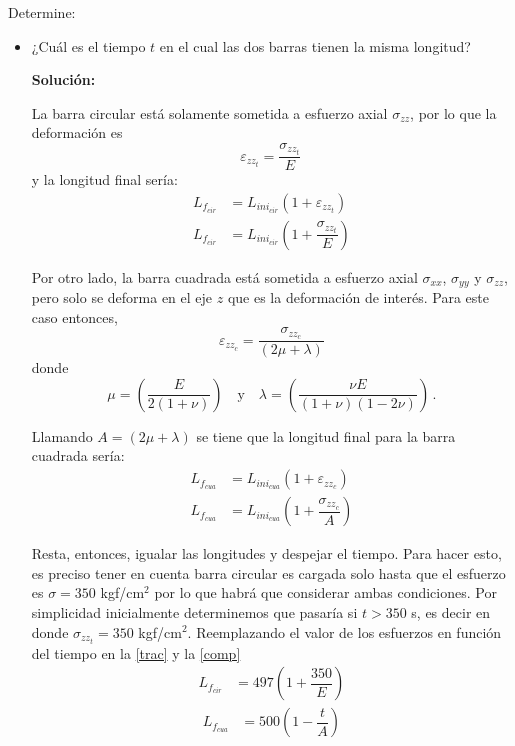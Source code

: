 \documentclass[../notas medios.tex]{subfiles}
\begin{document}
Determine:
\begin{itemize}
\item ¿Cuál es el tiempo $t$ en el cual las dos barras tienen la misma longitud?

\textbf{Solución:}

La barra circular está solamente sometida a esfuerzo axial $\sigma_{zz}$, por lo que la deformación es
\[\varepsilon _{zz_t} = \dfrac{\sigma_{zz_t} }{E}\, \]
y la longitud final sería:
\begin{equation}
  \begin{split}
  L_{f_{cir}} & = L_{ini_{cir}} (1 +  \varepsilon_{zz_t} )\\
  L_{f_{cir}} & = L_{ini_{cir}} \left(1+  \dfrac{\sigma_{zz_t} }{E}\right)
  \end{split}
  \label{trac}
\end{equation}

Por otro lado, la barra cuadrada está sometida a esfuerzo axial $\sigma_{xx}$, $\sigma_{yy}$ y $\sigma_{zz}$, pero solo se deforma en el eje $z$ que es la deformación de interés. Para este caso entonces,
\[\varepsilon _{zz_c} = \dfrac{\sigma_{zz_c} }{(2 \mu + \lambda)}\]
donde
\[\mu = \left(\dfrac{E}{2(1 + \nu)}\right)\quad  \text{y}\quad
\lambda =  \left(\dfrac{\nu{E}}{(1 + \nu) (1 - 2\nu)}\right)\, .\]

Llamando $A = (2 \mu + \lambda)$ se tiene que la longitud final para la barra cuadrada sería:
\begin{equation}
  \begin{split}
  L_{f_{cua}} & = L_{ini_{cua}} (1 +  \varepsilon_{zz_c}) \\
  L_{f_{cua}} & = L_{ini_{cua}} \left(1 +  \dfrac{\sigma_{zz_c} }{A}\right)
  \end{split}
\label{comp}
\end{equation}

Resta, entonces, igualar las longitudes y despejar el tiempo. Para hacer esto, es preciso tener en cuenta barra circular es cargada solo hasta que el esfuerzo es $\sigma=350$ kgf/cm$^2$ por lo que habrá que considerar ambas condiciones. Por simplicidad inicialmente determinemos que pasaría si $t > 350$ s, es decir en donde $\sigma_{zz_t} = 350$  kgf/cm$^2$. Reemplazando el valor de los esfuerzos en función del tiempo en la \cref {trac} y la  \cref{comp}
\begin{equation}
  \begin{split}
  L_{f_{cir}} & = 497 \left(1 +  \dfrac{350 }{E}\right)
  \end{split}
  \label{trac2}
\end{equation}
\begin{equation}
  \begin{split}
  L_{f_{cua}} & = 500 \left(1 - \dfrac{t }{A}\right)
  \end{split}
  \label{comp2}
\end{equation}


\end{itemize}
\end{document}

